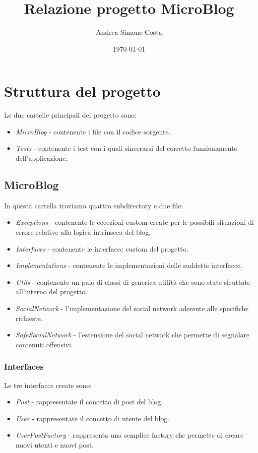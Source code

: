 \documentclass[a4paper,10pt]{article}
\title{Relazione progetto MicroBlog}
\author{Andrea Simone Costa}
\date{\today}
\begin{document}
\clearpage\maketitle
\thispagestyle{empty}


\newpage


\section*{Struttura del progetto}

Le due cartelle principali del progetto sono:

\begin{itemize}
    \item \emph{MicroBlog} - contenente i file con il codice sorgente.
    \item \emph{Tests} - contenente i test con i quali sincerarsi del corretto funzionamento dell'applicazione.
\end{itemize}

\subsection*{MicroBlog}

In questa cartella troviamo quattro subdirectory e due file:
\begin{itemize}
    \item \emph{Exceptions} - contenente le eccezioni custom create per le possibili situazioni di errore relative alla logica intrinseca del blog.
    \item \emph{Interfaces} - contenente le interfacce custom del progetto.
    \item \emph{Implementations} - contenente le implementazioni delle suddette interfacce.
    \item \emph{Utils} - contenente un paio di classi di generica utilità che sono state sfruttate all'interno del progetto.
    \item \emph{SocialNetwork} - l'implementazione del social network aderente alle specifiche richieste.
    \item \emph{SafeSocialNetwork} - l'estensione del social network che permette di segnalare contenuti offensivi.
\end{itemize}

\subsubsection*{Interfaces}
Le tre interfacce create sono:
\begin{itemize}
    \item \emph{Post} - rappresentate il concetto di post del blog.
    \item \emph{User} - rappresentate il concetto di utente del blog.
    \item \emph{UserPostFactory} - rappresenta una semplice factory che permette di creare nuovi utenti e nuovi post.
\end{itemize}
\end{document}
